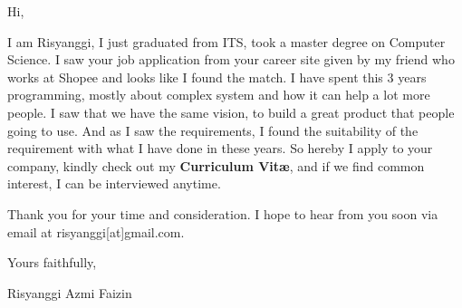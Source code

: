 \documentclass[letterpaper]{deedy-resume} %
\begin{document}
\begin{minipage}[t]{0.7\textwidth}

Hi,
\sectionspace

I am Risyanggi, I just graduated from ITS, took a master degree on Computer Science. I saw your job application from your career site given by my friend who works at Shopee and looks like I found the match. I have spent this 3 years programming, mostly about complex system and how it can help a lot more people. I saw that we have the same vision, to build a great product that people going to use. And as I saw the requirements, I found the suitability of the requirement with what I have done in these years. So hereby I apply to your company, kindly check out my \textbf{Curriculum Vitæ}, and if we find common interest, I can be interviewed anytime.

Thank you for your time and consideration. I hope to hear from you soon via email at risyanggi[at]gmail.com.

\sectionspace
\sectionspace
\sectionspace
\sectionspace
\sectionspace

Yours faithfully,
\sectionspace
\sectionspace
\sectionspace

Risyanggi Azmi Faizin
\end{minipage} %
\end{document}
